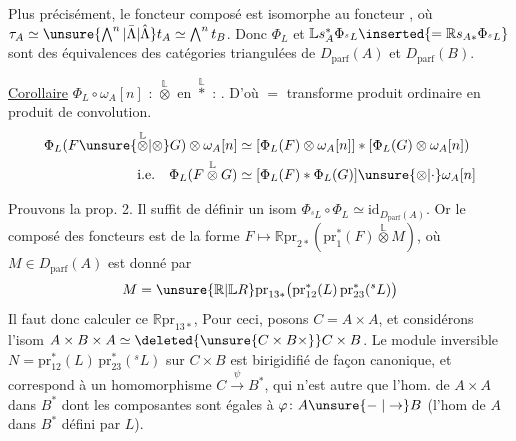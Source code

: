Plus précisément, le foncteur composé
est  isomorphe au foncteur  ,  où $\tau_A\simeq\unsure{\bigwedge^{n}|\bar{\Lambda}|\hat{\Lambda}}t_A\simeq\bigwedge^{n}t_B$. Donc $\Phi_L$ et $\mathbb{L} s_A^*\Phi_{{}^{s}L}\inserted{=\mathbb{R} s_{A*}\Phi_{{}^{s}L}}$ sont des équivalences des catégories triangulées de $D_{\mathrm{parf}}(A)$ et $D_{\mathrm{parf}}(B)$.

\uline{Corollaire}  $\Phi_L\circ\omega_A[n]$ :   $\overset{\mathbb L}{\otimes}$ en $\overset{\mathbb L}{*}$ : . D'où $=$    transforme produit ordinaire en  produit de convolution.
\[
\begin{aligned}
\Phi_L(F\unsure{\overset{\mathbb L}{\otimes}|\otimes}G)\otimes\omega_A[n]&\simeq[\Phi_L(F)\otimes\omega_A[n]]*[\Phi_L(G)\otimes\omega_A[n])\\
\text{i.e.}\quad \Phi_L(F\overset{\mathbb L}{\otimes} G)&\simeq[\Phi_L(F)*\Phi_L(G)]\unsure{\otimes|\mathbin{\cdot}}\omega_A[n]
\end{aligned}
\]

Prouvons la prop. 2. Il suffit de définir un isom $\Phi_{{}^{s}L}\circ\Phi_L\simeq \mathrm{id}_{D_{\mathrm{parf}}(A)}$. Or le composé des foncteurs est de la forme $F\longmapsto \mathbb{R} \mathrm{pr}_{2*}(\mathrm{pr}_1^*(F)\overset{\mathbb L}{\otimes} M)$, où $M\in D_{\mathrm{parf}}(A)$ est donné par
\[
M=\unsure{\mathbb{R}|\mathbb L R}\mathrm{pr}_{13*}\bigl(\mathrm{pr}_{12}^*(L)\,\mathrm{pr}_{23}^*({}^{s}L)\bigr)
\]
Il faut donc calculer ce $\mathbb{R} \mathrm{pr}_{13*}$,  Pour ceci, posons $C=A\times A$, et considérons l'isom $A\times B\times A\simeq\deleted{\unsure{C\times B\times}}C\times B$. Le module inversible $N=\mathrm{pr}_{12}^*(L)\,\mathrm{pr}_{23}^*({}^{s}L)$ sur $C\times B$ est  birigidifié de façon canonique, et correspond à un homomorphisme $C\xrightarrow{\psi}B^*$, qui n'est autre que l'hom. de $A\times A$ dans $B^*$ dont les  composantes sont égales à $\varphi\colon A\unsure{\mathrel{-}|\to}B$ (l'hom de $A$ dans $B^*$ défini par $L$).
